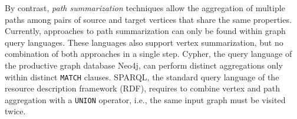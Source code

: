 By contrast, \textit{path summarization} techniques allow the aggregation of multiple paths among pairs of source and target vertices that share the same properties.
Currently, approaches to path summarization can only be found within graph query languages.
These languages also support vertex summarization, but no combination of both approaches in a single step.
Cypher, the query language of the productive graph database Neo4j, can perform distinct aggregations only within distinct \texttt{MATCH} clauses. SPARQL, the standard query language of the resource description framework (RDF), requires to combine vertex and path aggregation with a \texttt{UNION} operator, i.e., the same input graph must be visited twice.

